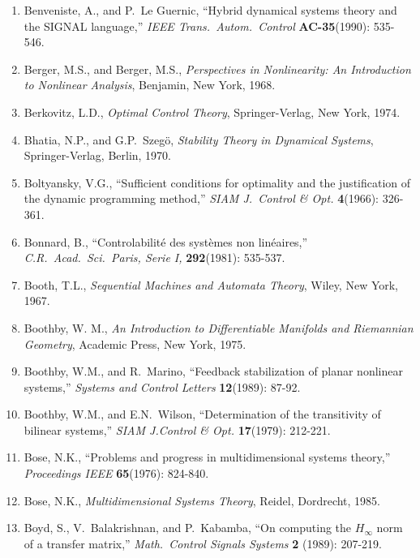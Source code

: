 \begin{enumerate}
\item
Benveniste, A., and P.\ Le Guernic, ``Hybrid dynamical systems theory and the
SIGNAL language,'' {\it IEEE Trans.\ Autom.\ Control} {\bf AC-35}(1990):
535-546.

\item
Berger, M.S., and Berger, M.S., {\it Perspectives in Nonlinearity: An
Introduction to Nonlinear Analysis}, Benjamin, New York, 1968.

\item
Berkovitz, L.D., {\it Optimal Control Theory}, Springer-Verlag, New York,
1974.

\item
Bhatia, N.P., and G.P.\ Szeg\"o, {\it Stability Theory in Dynamical Systems},
Springer-Verlag, Berlin, 1970.

\item
Boltyansky, V.G., ``Sufficient conditions for optimality and the justification
of the dynamic programming method,'' {\it SIAM J.\ Control \& Opt.} {\bf
4}(1966): 326-361.

\item
Bonnard, B., ``Controlabilit\'e des syst\`emes non lin\'eaires,'' {\it C.R.\
Acad.\ Sci.\ Paris, Serie I,} {\bf 292}(1981): 535-537.

\item
Booth, T.L., {\it Sequential Machines and Automata Theory}, Wiley, New York,
1967.

\item
Boothby, W. M., {\it An Introduction to Differentiable Manifolds and
Riemannian Geometry}, Academic Press, New York, 1975.

\item
Boothby, W.M., and R.\ Marino, ``Feedback stabilization of planar nonlinear
systems,'' {\it Systems and Control Letters} {\bf 12}(1989): 87-92.

\item
Boothby, W.M., and E.N.\ Wilson, ``Determination of the transitivity of
bilinear systems,'' {\it SIAM J.Control \& Opt.} {\bf 17}(1979): 212-221.

\item
Bose, N.K., ``Problems and progress in multidimensional systems theory,'' {\it
Proceedings IEEE} {\bf 65}(1976): 824-840.

\item
Bose, N.K., {\it Multidimensional Systems Theory}, Reidel, Dordrecht, 1985.

\item
Boyd, S., V.\ Balakrishnan, and P.\ Kabamba, ``On computing the $H_\infty$
norm of a transfer matrix,'' {\it Math.\ Control Signals Systems} {\bf 2}
(1989): 207-219.


\end{enumerate}
